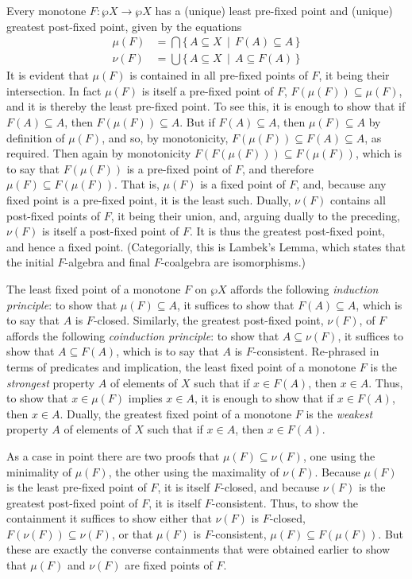 \documentclass[11pt,twoside]{article}
\begin{document}
Every monotone $F:\wp{X}\to\wp{X}$ has a (unique) least pre-fixed point and (unique)
greatest post-fixed point, given by the equations
\begin{align*}
  \mu(F) & = \bigcap\{\,A\subseteq X\,\mid\, F(A)\subseteq A\,\} \\
  \nu(F) & = \bigcup\{\,A\subseteq X\,\mid\,A\subseteq F(A)\,\}
\end{align*}
It is evident that $\mu(F)$ is contained in all pre-fixed points of $F$, it being their
intersection.  In fact $\mu(F)$ is itself a pre-fixed point of $F$,
$F(\mu(F))\subseteq \mu(F)$, and it is thereby the least pre-fixed point.  To see this, it is enough
to show that if $F(A)\subseteq A$, then $F(\mu(F))\subseteq A$.  But if $F(A)\subseteq A$, then
$\mu(F)\subseteq A$ by definition of $\mu(F)$, and so, by monotonicity,
$F(\mu(F))\subseteq F(A)\subseteq A$, as required.  Then again by monotonicity
$F(F(\mu(F)))\subseteq F(\mu(F))$, which is to say that $F(\mu(F))$ is a pre-fixed point of
$F$, and therefore $\mu(F)\subseteq F(\mu(F))$.  That is, $\mu(F)$ is a fixed point of
$F$, and, because any fixed point is a pre-fixed point, it is the least such.  Dually,
$\nu(F)$ contains all post-fixed points of $F$, it being their union, and, arguing dually to
the preceding, $\nu(F)$ is itself a post-fixed point of $F$.  It is thus the greatest
post-fixed point, and hence a fixed point.  (Categorially, this is Lambek's Lemma, which
states that the initial $F$-algebra and final $F$-coalgebra are isomorphisms.)

\smallskip

The least fixed point of a monotone $F$ on $\wp{X}$ affords the following \emph{induction
  principle}: to show that $\mu(F)\subseteq A$, it suffices to show that
$F(A)\subseteq A$, which is to say that $A$ is $F$-closed.  Similarly, the greatest post-fixed
point, $\nu(F)$, of $F$ affords the following \emph{coinduction principle}: to show that
$A\subseteq \nu(F)$, it suffices to show that $A\subseteq F(A)$, which is to say that $A$ is
$F$-consistent.  Re-phrased in terms of predicates and implication, the least fixed point
of a monotone $F$ is the \emph{strongest} property $A$ of elements of $X$ such that if
$x\in F(A)$, then $x\in A$. Thus, to show that $x\in\mu(F)$ implies $x\in A$, it is enough to show
that if $x\in F(A)$, then $x\in A$.  Dually, the greatest fixed point of a monotone $F$ is the
\emph{weakest} property $A$ of elements of $X$ such that if $x\in A$, then $x\in F(A)$.

As a case in point there are two proofs that $\mu(F)\subseteq\nu(F)$, one using the minimality of
$\mu(F)$, the other using the maximality of $\nu(F)$.  Because $\mu(F)$ is the least pre-fixed
point of $F$, it is itself $F$-closed, and because $\nu(F)$ is the greatest post-fixed point
of $F$, it is itself $F$-consistent.  Thus, to show the containment it suffices to show
either that $\nu(F)$ is $F$-closed, $F(\nu(F))\subseteq\nu(F)$, or that $\mu(F)$ is
$F$-consistent, $\mu(F)\subseteq F(\mu(F))$.  But these are exactly the converse containments that
were obtained earlier to show that $\mu(F)$ and $\nu(F)$ are fixed points of $F$.
\end{document}
